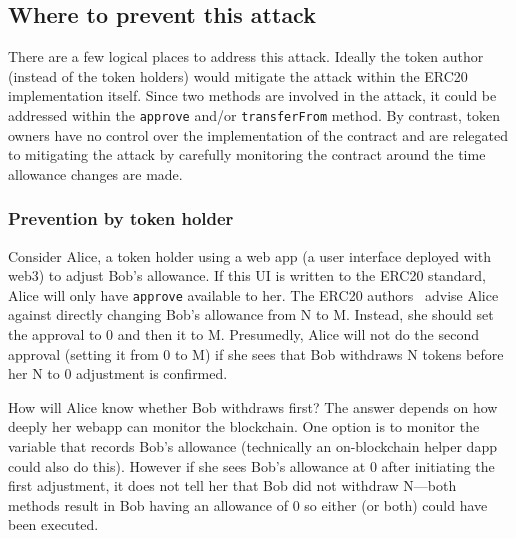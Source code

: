 \subsection{Where to prevent this attack}

There are a few logical places to address this attack. Ideally the token author (instead of the token holders) would mitigate the attack within the ERC20 implementation itself. Since two methods are involved in the attack, it could be addressed within the \texttt{approve} and/or \texttt{transferFrom} method. By contrast, token owners have no control over the implementation of the contract and are relegated to mitigating the attack by carefully monitoring the contract around the time allowance changes are made.


\subsubsection*{Prevention by token holder}
\label{sec:preui}

Consider Alice, a token holder using a web app (\eg a user interface deployed with web3) to adjust Bob's allowance. If this UI is written to the ERC20 standard, Alice will only have \texttt{approve} available to her. The ERC20 authors~\cite{Ref08} advise Alice against directly changing Bob's allowance from N to M. Instead, she should set the approval to 0 and then it to M. Presumedly, Alice will not do the second approval (setting it from 0 to M) if she sees that Bob withdraws N tokens before her N to 0 adjustment is confirmed. 

How will Alice know whether Bob withdraws first? The answer depends on how deeply her webapp can monitor the blockchain. One option is to monitor the variable that records Bob's allowance (technically an on-blockchain helper dapp could also do this). However if she sees Bob's allowance at 0 after initiating the first adjustment, it does not tell her that Bob did not withdraw N---both methods result in Bob having an allowance of 0 so either (or both) could have been executed.

